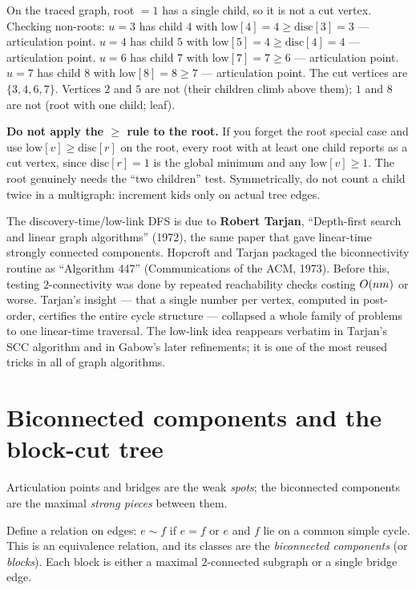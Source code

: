 On the traced graph, root $=1$ has a single child, so it is not a cut vertex. Checking
non-roots: $u=3$ has child $4$ with $\mathrm{low}[4]=4\ge\mathrm{disc}[3]=3$ ---
articulation point. $u=4$ has child $5$ with $\mathrm{low}[5]=4\ge\mathrm{disc}[4]=4$
--- articulation point. $u=6$ has child $7$ with $\mathrm{low}[7]=7\ge6$ --- articulation
point. $u=7$ has child $8$ with $\mathrm{low}[8]=8\ge7$ --- articulation point. The cut
vertices are $\{3,4,6,7\}$. Vertices $2$ and $5$ are not (their children climb above
them); $1$ and $8$ are not (root with one child; leaf).

\begin{trapbox}
\textbf{Do not apply the $\ge$ rule to the root.} If you forget the root special case
and use $\mathrm{low}[v]\ge\mathrm{disc}[r]$ on the root, every root with at least one
child reports as a cut vertex, since $\mathrm{disc}[r]=1$ is the global minimum and any
$\mathrm{low}[v]\ge1$. The root genuinely needs the ``two children'' test.
Symmetrically, do not count a child twice in a multigraph: increment $\mathrm{kids}$
only on actual tree edges.
\end{trapbox}

\begin{historybox}
The discovery-time/low-link DFS is due to \textbf{Robert Tarjan}, ``Depth-first search
and linear graph algorithms'' (1972), the same paper that gave linear-time strongly
connected components. Hopcroft and Tarjan packaged the biconnectivity routine as
``Algorithm 447'' (Communications of the ACM, 1973). Before this, testing
$2$-connectivity was done
by repeated reachability checks costing $O(nm)$ or worse. Tarjan's insight --- that a
single number per vertex, computed in post-order, certifies the entire cycle structure
--- collapsed a whole family of problems to one linear-time traversal. The low-link
idea reappears verbatim in Tarjan's SCC algorithm and in Gabow's later refinements; it
is one of the most reused tricks in all of graph algorithms.
\end{historybox}

\section{Biconnected components and the block-cut tree}
\label{ch10:bcc}

Articulation points and bridges are the weak \emph{spots}; the biconnected components
are the maximal \emph{strong pieces} between them.

\begin{definition}
\label{ch10:def-block}
Define a relation on edges: $e\sim f$ if $e=f$ or $e$ and $f$ lie on a common simple
cycle. This is an equivalence relation, and its classes are the \emph{biconnected
components} (or \emph{blocks}). Each block is either a maximal $2$-connected subgraph
or a single bridge edge.
\end{definition}

